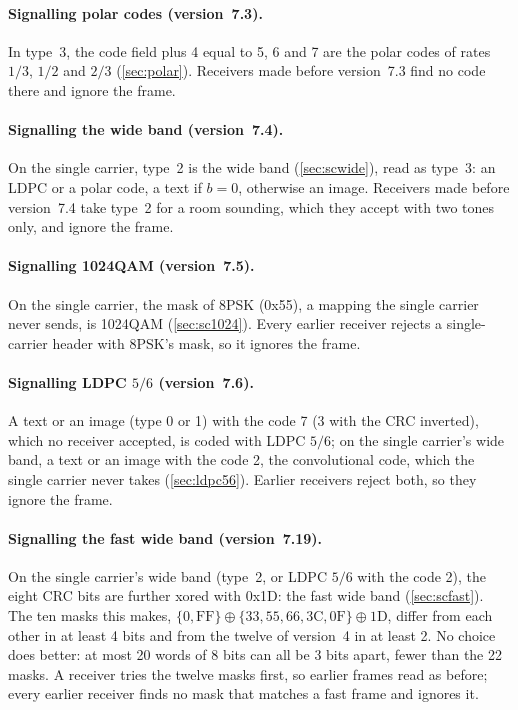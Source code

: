 \documentclass[11pt,a4paper]{article}
\theoremstyle{remark}
\begin{document}
\paragraph{Signalling polar codes (version~7.3).}
In type~3, the code field plus 4 equal to 5, 6 and 7 are the polar codes of rates $1/3$, $1/2$ and $2/3$ (\cref{sec:polar}). Receivers made before version~7.3 find no code there and ignore the frame.

\paragraph{Signalling the wide band (version~7.4).}
On the single carrier, type~2 is the wide band (\cref{sec:scwide}), read as type~3: an LDPC or a polar code, a text if $b = 0$, otherwise an image. Receivers made before version~7.4 take type~2 for a room sounding, which they accept with two tones only, and ignore the frame.

\paragraph{Signalling 1024QAM (version~7.5).}
On the single carrier, the mask of 8PSK (0x55), a mapping the single carrier never sends, is 1024QAM (\cref{sec:sc1024}). Every earlier receiver rejects a single-carrier header with 8PSK's mask, so it ignores the frame.

\paragraph{Signalling LDPC $5/6$ (version~7.6).}
A text or an image (type 0 or 1) with the code 7 (3 with the CRC inverted), which no receiver accepted, is coded with LDPC $5/6$; on the single carrier's wide band, a text or an image with the code 2, the convolutional code, which the single carrier never takes (\cref{sec:ldpc56}). Earlier receivers reject both, so they ignore the frame.

\paragraph{Signalling the fast wide band (version~7.19).}
On the single carrier's wide band (type~2, or LDPC $5/6$ with the code 2), the eight CRC bits are further xored with 0x1D: the fast wide band (\cref{sec:scfast}). The ten masks this makes, $\{0, \mathrm{FF}\} \oplus \{33, 55, 66, 3\mathrm{C}, 0\mathrm{F}\} \oplus 1\mathrm{D}$, differ from each other in at least 4 bits and from the twelve of version~4 in at least 2. No choice does better: at most 20 words of 8 bits can all be 3 bits apart, fewer than the 22 masks. A receiver tries the twelve masks first, so earlier frames read as before; every earlier receiver finds no mask that matches a fast frame and ignores it.
\end{document}
